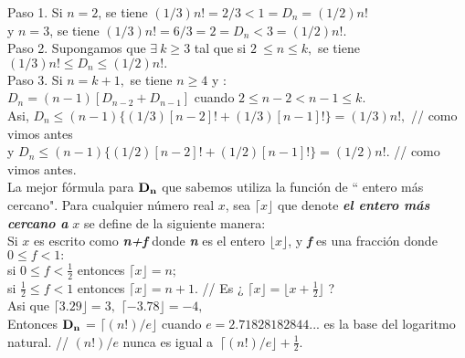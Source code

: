 \documentclass[11pt,a4paper]{article}
\begin{document}
Paso 1. Si $n = 2$, se tiene $(1/3)n! = 2/3 < 1 = D_{n} = (1/2)n!$\\
\hspace*{0.5cm} y \hspace{1,2cm} $n = 3$, se tiene $(1/3)n! = 6/3 = 2 = D_{n}<3 = (1/2)n!.$\\

Paso 2. Supongamos que $\exists ~k \geq 3$ tal que si $2 ~\leq n \leq k,$ se tiene $(1/3)n! \leq D_{n} \leq (1/2)n!.$\\

Paso 3. Si $n = k+1,$ se tiene $n \geq 4$ y :\\
\hspace*{1,9cm} $D_{n} = (n-1)[D_{n-2} + D_{n-1}]$ cuando $2 \leq n-2 <n-1 \leq k.$\\

Asi, \hspace*{0.50cm} $D_{n} \leq (n-1)\{(1/3)[n-2]! + (1/3)[n-1]!\} = (1/3)n!,$ // como vimos antes\\

y \hspace{1,0cm} $D_{n} \leq (n-1)\{(1/2)[n-2]! + (1/2)[n-1]!\} = (1/2)n!.$ // como vimos antes.\\

La mejor fórmula para $\bf{D_{n}}$ que sabemos utiliza la función de `` entero más cercano". Para cualquier número real $x$, sea $\lceil x \rfloor$ que denote \textit{\textbf{el entero más cercano a}} $x$ se define de la siguiente manera: \\
Si $x$ es escrito como \textit{\textbf{n+f}} donde \textit{\textbf{n}} es el entero $\lfloor x \rfloor$, y \textit{\textbf{f}} es una fracción donde $0 \leq f < 1 :$\\

si $0 \leq f < \frac{1}{2}$ \hspace{2cm} entonces $\lceil x \rfloor = n;$\\

si $\frac{1}{2} \leq f < 1$ \hspace{2cm} entonces $\lceil x \rfloor = n+1.$ // Es ¿ $\lceil x \rfloor = \lfloor x + \frac{1}{2} \rfloor$ ? \\

Asi que $\lceil 3.29 \rfloor = 3,$ \hspace{0.8cm}  $\lceil -3.78 \rfloor = -4,$\\

Entonces $\bf{D_{n}}$ = $\lceil(n!)/e\rfloor$ cuando $e = 2.71828182844...$ es la base del logaritmo natural.  // $(n!)/e$  nunca es igual a $~\lceil(n!)/e\rfloor + \frac{1}{2}.$
\end{document}

